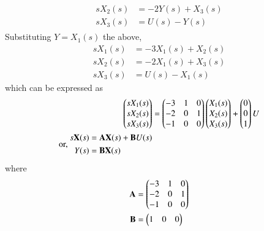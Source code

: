 \begin{enumerate}[label=\thesection.\arabic*.,ref=\thesection.\theenumi]
\begin{align}
\begin{split}
sX_{2}(s)&=-2Y(s)+X_{3}(s)\\
sX_{3}(s)&=U(s)-Y(s)
\end{split}
\end{align} 
Substituting  $ Y=X_{1}(s)$ the above, 
\begin{align}
sX_{1}(s)&=-3X_{1}(s)+X_{2}(s)\\
sX_{2}(s)&=-2X_{1}(s)+X_{3}(s)\\
sX_{3}(s)&=U(s)-X_{1}(s)
\end{align} 
which can be expressed as
\begin{align}
\begin{pmatrix}sX_{1}(s)\\sX_{2}(s)\\sX_{3}(s)\end{pmatrix}
&=
\begin{pmatrix}-3&1&0\\-2&0&1\\-1&0&0\end{pmatrix}\begin{pmatrix}X_{1}(s)\\X_{2}(s)\\X_{3}(s)\end{pmatrix}
+
\begin{pmatrix}0\\0\\1\end{pmatrix}  U
\\
\text{or, }
\begin{split}
s\mathbf{X}(s) &= \mathbf{A}\mathbf{X}(s) + \mathbf{B}U(s)
\\
Y(s) &= \mathbf{B}\mathbf{X}(s)
\end{split}
\end{align}
where
\begin{align}
\mathbf{A}&=\begin{pmatrix}-3&1&0\\-2&0&1\\-1&0&0\end{pmatrix}
\\
\mathbf{B}&= \begin{pmatrix}1&0&0\end{pmatrix}
\end{align}
%
%
%

\end{enumerate}
